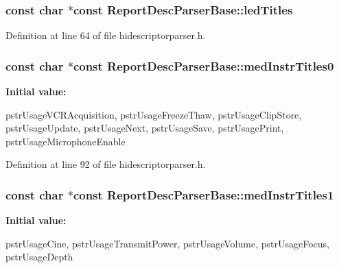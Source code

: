 \hypertarget{class_report_desc_parser_base_a7425dac090961547ddf7622112b98a9e}{
\subsubsection[{led\-Titles}]{\setlength{\rightskip}{0pt plus 5cm}const char $\ast$const {\bf \-Report\-Desc\-Parser\-Base\-::led\-Titles}}}\label{class_report_desc_parser_base_a7425dac090961547ddf7622112b98a9e}


\-Definition at line 64 of file hidescriptorparser.\-h.

\hypertarget{class_report_desc_parser_base_a3d8d0fa8512f718e8b574e4d9e8a775f}{
\subsubsection[{med\-Instr\-Titles0}]{\setlength{\rightskip}{0pt plus 5cm}const char $\ast$const {\bf \-Report\-Desc\-Parser\-Base\-::med\-Instr\-Titles0}}}\label{class_report_desc_parser_base_a3d8d0fa8512f718e8b574e4d9e8a775f}
{\bfseries \-Initial value\-:}
\begin{DoxyCode}
 {
        pstrUsageVCRAcquisition,
        pstrUsageFreezeThaw,
        pstrUsageClipStore,
        pstrUsageUpdate,
        pstrUsageNext,
        pstrUsageSave,
        pstrUsagePrint,
        pstrUsageMicrophoneEnable
}
\end{DoxyCode}


\-Definition at line 92 of file hidescriptorparser.\-h.

\hypertarget{class_report_desc_parser_base_a3e22173cfb0358f71357224f88ba7233}{
\subsubsection[{med\-Instr\-Titles1}]{\setlength{\rightskip}{0pt plus 5cm}const char $\ast$const {\bf \-Report\-Desc\-Parser\-Base\-::med\-Instr\-Titles1}}}\label{class_report_desc_parser_base_a3e22173cfb0358f71357224f88ba7233}
{\bfseries \-Initial value\-:}
\begin{DoxyCode}
 {
        pstrUsageCine,
        pstrUsageTransmitPower,
        pstrUsageVolume,
        pstrUsageFocus,
        pstrUsageDepth
}
\end{DoxyCode}


